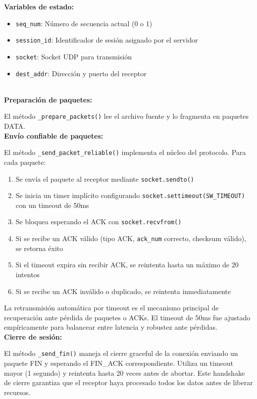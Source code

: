 \textbf{Variables de estado:}
\begin{itemize}
    \item \texttt{seq\_num}: Número de secuencia actual (0 o 1)
    \item \texttt{session\_id}: Identificador de sesión asignado por el servidor
    \item \texttt{socket}: Socket UDP para transmisión
    \item \texttt{dest\_addr}: Dirección y puerto del receptor
\end{itemize}
\\

\textbf{Preparación de paquetes:}

El método \texttt{\_prepare\_packets()} lee el archivo fuente y lo fragmenta en paquetes DATA.
\\

\textbf{Envío confiable de paquetes:}

El método \texttt{\_send\_packet\_reliable()} implementa el núcleo del protocolo. Para cada paquete:

\begin{enumerate}
    \item Se envía el paquete al receptor mediante \texttt{socket.sendto()}
    \item Se inicia un timer implícito configurando \texttt{socket.settimeout(SW\_TIMEOUT)} con un timeout de 50ms
    \item Se bloquea esperando el ACK con \texttt{socket.recvfrom()}
    \item Si se recibe un ACK válido (tipo ACK, \texttt{ack\_num} correcto, checksum válido), se retorna éxito
    \item Si el timeout expira sin recibir ACK, se reintenta hasta un máximo de 20 intentos
    \item Si se recibe un ACK inválido o duplicado, se reintenta inmediatamente
\end{enumerate}

La retransmisión automática por timeout es el mecanismo principal de recuperación ante pérdida de paquetes o ACKs. El timeout de 50ms fue ajustado empíricamente para balancear entre latencia y robustez ante pérdidas.
\\

\textbf{Cierre de sesión:}

El método \texttt{\_send\_fin()} maneja el cierre graceful de la conexión enviando un paquete FIN y esperando el FIN\_ACK correspondiente. Utiliza un timeout mayor (1 segundo) y reintenta hasta 20 veces antes de abortar. Este handshake de cierre garantiza que el receptor haya procesado todos los datos antes de liberar recursos.

